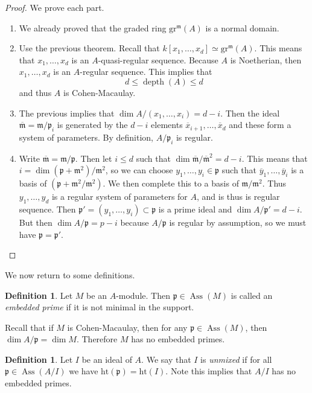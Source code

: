 \documentclass[leqno, openany]{memoir}
\theoremstyle{definition}
\newtheorem{defn}[thm]{Definition}
\theoremstyle{remark}
\theoremstyle{plain}
\theoremstyle{definition}
\theoremstyle{remark}
\newcommand{\mf}[1]{\mathfrak{#1}}
\newcommand{\mr}[1]{\mathrm{#1}}
\newcommand{\ol}[1]{\overline{#1}}
\DeclareMathOperator{\Ass}{Ass}
\DeclareMathOperator{\dpth}{depth}
\begin{document}
\begin{proof} We prove each part.  \begin{enumerate} \item We already proved
    that the graded ring $\mr{gr}^{\mf{m}}(A)$ is a normal domain.  \item  Use
    the previous theorem. Recall that $k[x_1, \ldots, x_d] \simeq
    \mr{gr}^{\mf{m}}(A)$. This means that $x_1, \ldots, x_d$ is an
    $A$-quasi-regular sequence. Because $A$ is Noetherian, then $x_1, \ldots,
    x_d$ is an $A$-regular sequence. This implies that \[ d \leq \dpth(A) \leq
    d \] and thus $A$ is Cohen-Macaulay.  \item The previous implies that $\dim
    A / (x_1, \ldots, x_i) = d-i$. Then the ideal $\ol{\mf{m}} = \mf{m} /
    \mf{p}_i$ is generated by the $d-i$ elements $\ol{x}_{i+1}, \ldots,
    \ol{x}_d$ and these form a system of parameters. By definition, $A/
    \mf{p}_i$ is regular.  \item Write $\ol{\mf{m}} = \mf{m} / \mf{p}$. Then
    let $i \leq d$ such that $\dim \ol{\mf{m}} / \ol{\mf{m}}^2 = d-i$. This
    means that $i = \dim ( \mf{p}+\mf{m}^2  )/ \mf{m^2}$, so we can choose
    $y_1, \ldots, y_i \in \mf{p}$ such that $\ol{y}_1, \ldots, \ol{y}_i$ is a
    basis of $(\mf{p} + \mf{m}^2 / \mf{m}^2)$. We then complete this to a basis
    of $\mf{m} / \mf{m}^2$. Thus $y_1, \ldots, y_d$ is a regular system of
    parameters for $A$, and is thus is regular sequence. Then $\mf{p}' = (y_1,
    \ldots, y_i) \subset \mf{p}$ is a prime ideal and $\dim A/\mf{p}' = d-i$.
    But then $\dim A/\mf{p} = p-i$ because $A/\mf{p}$ is regular by assumption,
    so we must have $\mf{p} = \mf{p}'$. \qedhere \end{enumerate} \end{proof}

We now return to some definitions.

\begin{defn} Let $M$ be an $A$-module. Then $\mf{p} \in \Ass(M)$ is called an
\textit{embedded prime} if it is not minimal in the support.  \end{defn}

Recall that if $M$ is Cohen-Macaulay, then for any $\mf{p} \in \Ass(M)$, then
$\dim A/\mf{p} = \dim M$. Therefore $M$ has no embedded primes.

\begin{defn} Let $I$ be an ideal of $A$. We say that $I$ is \textit{unmixed} if
for all $\mf{p} \in \Ass(A/I)$ we have $\mr{ht}(\mf{p}) = \mr{ht}(I)$. Note
this implies that $A/I$ has no embedded primes.  \end{defn}
\end{document}
